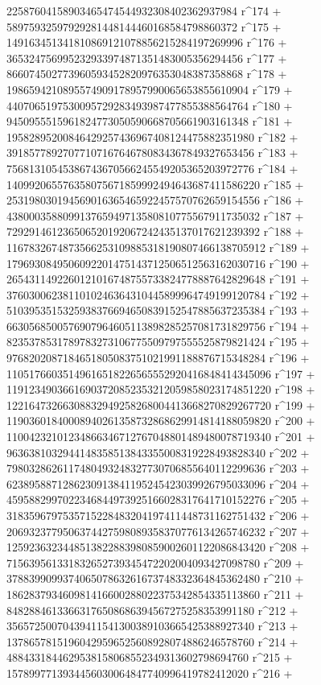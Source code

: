        22587604158903465474544932308402362937984 r^174 + 
       58975932597929281448144460168584798860372 r^175 + 
       149163451341810869121078856215284197269996 r^176 + 
       365324756995232933974871351483005356294456 r^177 + 
       866074502773960593452820976353048387358868 r^178 + 
       1986594210895574909178957990065653855610904 r^179 + 
       4407065197530095729283493987477855388564764 r^180 + 
       9450955515961824773050590668705661903161348 r^181 + 
       19582895200846429257436967408124475882351980 r^182 + 
       39185778927077107167646780834367849327653456 r^183 + 
       75681310545386743670566245549205365203972776 r^184 + 
       140992065576358075671859992494643687411586220 r^185 + 
       253198030194569016365465922457570762659154556 r^186 + 
       438000358809913765949713580810775567911735032 r^187 + 
       729291461236506520192067242435137017621239392 r^188 + 
       1167832674873566253109885318190807466138705912 r^189 + 
       1796930849506092201475143712506512563162030716 r^190 + 
       2654311492260121016748755733824778887642829648 r^191 + 
       3760300623811010246364310445899964749199120784 r^192 + 
       5103953515325938376694650839152547885637235384 r^193 + 
       6630568500576907964605113898285257081731829756 r^194 + 
       8235378531789783273106775509797555525879821424 r^195 + 
       9768202087184651805083751021991188876715348284 r^196 + 
       11051766035149616518226565552920416848414345096 r^197 + 
       11912349036616903720852353212059858023174851220 r^198 + 
       12216473266308832949258268004413668270829267720 r^199 + 
       11903601840008940261358732868629914814188059820 r^200 + 
       11004232101234866346712767048801489480078719340 r^201 + 
       9636381032944148358513843355008319228493828340 r^202 + 
       7980328626117480493248327730706855640112299636 r^203 + 
       6238958871286230913841195245423039926795033096 r^204 + 
       4595882997022346844973925166028317641710152276 r^205 + 
       3183596797535715228483204197411448731162751432 r^206 + 
       2069323779506374427598089358370776134265746232 r^207 + 
       1259236323448513822883980859002601122086843420 r^208 + 
       715639561331832652739345472202004093427098780 r^209 + 
       378839909937406507863261673748332364845362480 r^210 + 
       186283793460981416600288022375342854335113860 r^211 + 
       84828846133663176508686394567275258353991180 r^212 + 
       35657250070439411541300389103665425388927340 r^213 + 
       13786578151960429596525608928074886246578760 r^214 + 
       4884331844629538158068552349313602798694760 r^215 + 
       1578997713934456030064847740996419782412020 r^216 + 
